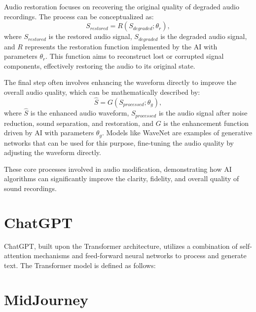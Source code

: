 \documentclass[11pt,a4paper,oneside]{report}
\begin{document}
Audio restoration focuses on recovering the original quality of degraded audio recordings. The process can be conceptualized as:
\begin{equation}
S_{restored} = R(S_{degraded}; \theta_r),
\end{equation}
where $S_{restored}$ is the restored audio signal, $S_{degraded}$ is the degraded audio signal, and $R$ represents the restoration function implemented by the AI with parameters $\theta_r$. This function aims to reconstruct lost or corrupted signal components, effectively restoring the audio to its original state.

The final step often involves enhancing the waveform directly to improve the overall audio quality, which can be mathematically described by:
\begin{equation}
\hat{S} = G(S_{processed}; \theta_g),
\end{equation}
where $\hat{S}$ is the enhanced audio waveform, $S_{processed}$ is the audio signal after noise reduction, sound separation, and restoration, and $G$ is the enhancement function driven by AI with parameters $\theta_g$. Models like WaveNet are examples of generative networks that can be used for this purpose, fine-tuning the audio quality by adjusting the waveform directly.

These core processes involved in audio modification, demonstrating how AI algorithms can significantly improve the clarity, fidelity, and overall quality of sound recordings. 


\section{ChatGPT}

ChatGPT, built upon the Transformer architecture, utilizes a combination of self-attention mechanisms and feed-forward neural networks to process and generate text. The Transformer model is defined as follows:

\section{MidJourney}
\end{document}
